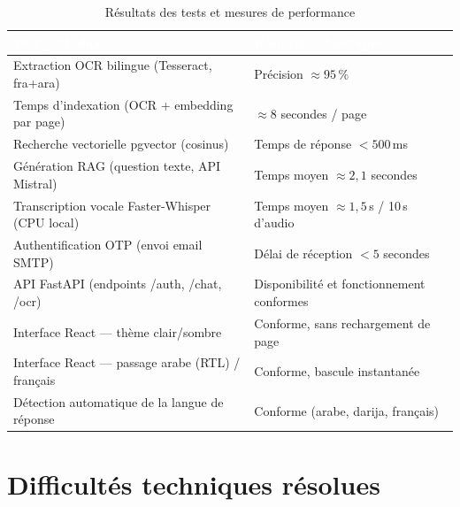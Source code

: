 \documentclass[12pt,a4paper]{report}
\begin{document}
\begin{table}[H]
\centering
\caption{Résultats des tests et mesures de performance}
\label{tab:tests}
\renewcommand{\arraystretch}{1.35}
\begin{tabularx}{\linewidth}{X >{\centering\arraybackslash\small}p{4.5cm}}
\arrayrulecolor{darkblue}\hline
\rowcolor{tableheader}
\textcolor{white}{\textbf{Test / Module}} &
\textcolor{white}{\textbf{Résultat / Métrique}} \\
\hline
\rowcolor{tableroweven} Extraction OCR bilingue (Tesseract, fra+ara) & Précision $\approx 95$\,\% \\
\hline
\rowcolor{tablerowodd} Temps d'indexation (OCR + embedding par page) & $\approx 8$ secondes / page \\
\hline
\rowcolor{tableroweven} Recherche vectorielle pgvector (cosinus) & Temps de réponse $< 500$\,ms \\
\hline
\rowcolor{tablerowodd} Génération RAG (question texte, API Mistral) & Temps moyen $\approx 2{,}1$ secondes \\
\hline
\rowcolor{tableroweven} Transcription vocale Faster-Whisper (CPU local) & Temps moyen $\approx 1{,}5$\,s / 10\,s d'audio \\
\hline
\rowcolor{tablerowodd} Authentification OTP (envoi email SMTP) & Délai de réception $< 5$ secondes \\
\hline
\rowcolor{tableroweven} API FastAPI (endpoints /auth, /chat, /ocr) & Disponibilité et fonctionnement conformes \\
\hline
\rowcolor{tablerowodd} Interface React --- thème clair/sombre & Conforme, sans rechargement de page \\
\hline
\rowcolor{tableroweven} Interface React --- passage arabe (RTL) / français & Conforme, bascule instantanée \\
\hline
\rowcolor{tablerowodd} Détection automatique de la langue de réponse & Conforme (arabe, darija, français) \\
\hline
\end{tabularx}
\end{table}

\section{Difficultés techniques résolues}
\end{document}
